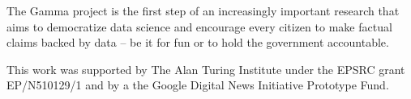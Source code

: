 \documentclass[sigconf,english]{acmart}
\begin{document}
The Gamma project is the first step of an increasingly important research that aims to democratize 
data science and encourage every citizen to make factual claims backed by data -- be it for fun or to hold the government accountable.

\begin{acks}
This work was supported by The Alan Turing Institute under the EPSRC grant EP/N510129/1
and by a the Google Digital News Initiative Prototype Fund. 
\end{acks}

\newpage
\nocite{*}



\end{document}
